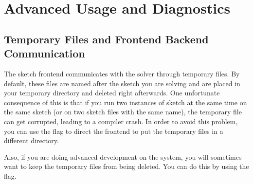 \section{Advanced Usage and Diagnostics}


\subsection{Temporary Files and Frontend Backend Communication}

The sketch frontend communicates with the solver through temporary files. 
By default, these files are named after the sketch you are solving and 
are placed in your temporary directory and deleted right afterwards. One 
unfortunate consequence of this is that if you run two instances of sketch at the same 
time on the same sketch (or on two sketch files with the same name), the temporary file
can get corrupted, leading to a compiler crash. In order to avoid this problem, you can use the flag 
 to direct the frontend to put the temporary files in a different directory. 


Also, if you are doing advanced development on the system, you will sometimes want to keep 
the temporary files from being deleted. You can do this by using the  flag.

